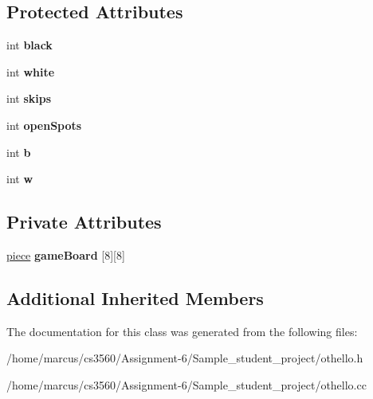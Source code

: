\subsection*{Protected Attributes}
\begin{DoxyCompactItemize}
\item 
int {\bfseries black}\hypertarget{classmain__savitch__14_1_1_othello_a2eed818925f68d5678b78107a3298138}{}\label{classmain__savitch__14_1_1_othello_a2eed818925f68d5678b78107a3298138}

\item 
int {\bfseries white}\hypertarget{classmain__savitch__14_1_1_othello_a7d5f59b1e581ed7a8145debeecf4f310}{}\label{classmain__savitch__14_1_1_othello_a7d5f59b1e581ed7a8145debeecf4f310}

\item 
int {\bfseries skips}\hypertarget{classmain__savitch__14_1_1_othello_a85d4ce17512d8dbf85a313a27eea0644}{}\label{classmain__savitch__14_1_1_othello_a85d4ce17512d8dbf85a313a27eea0644}

\item 
int {\bfseries open\+Spots}\hypertarget{classmain__savitch__14_1_1_othello_a15045e3e94c34afe08240885e230d502}{}\label{classmain__savitch__14_1_1_othello_a15045e3e94c34afe08240885e230d502}

\item 
int {\bfseries b}\hypertarget{classmain__savitch__14_1_1_othello_a98fbc46241d2f5e05ccb4b66f11535bf}{}\label{classmain__savitch__14_1_1_othello_a98fbc46241d2f5e05ccb4b66f11535bf}

\item 
int {\bfseries w}\hypertarget{classmain__savitch__14_1_1_othello_a1b11c5fe33e30a94ed39e8cb55caf37e}{}\label{classmain__savitch__14_1_1_othello_a1b11c5fe33e30a94ed39e8cb55caf37e}

\end{DoxyCompactItemize}
\subsection*{Private Attributes}
\begin{DoxyCompactItemize}
\item 
\hyperlink{classpiece}{piece} {\bfseries game\+Board} \mbox{[}8\mbox{]}\mbox{[}8\mbox{]}\hypertarget{classmain__savitch__14_1_1_othello_adfed6b6a6832189a54901f955f57abb7}{}\label{classmain__savitch__14_1_1_othello_adfed6b6a6832189a54901f955f57abb7}

\end{DoxyCompactItemize}
\subsection*{Additional Inherited Members}


The documentation for this class was generated from the following files\+:\begin{DoxyCompactItemize}
\item 
/home/marcus/cs3560/\+Assignment-\/6/\+Sample\+\_\+student\+\_\+project/othello.\+h\item 
/home/marcus/cs3560/\+Assignment-\/6/\+Sample\+\_\+student\+\_\+project/othello.\+cc\end{DoxyCompactItemize}
